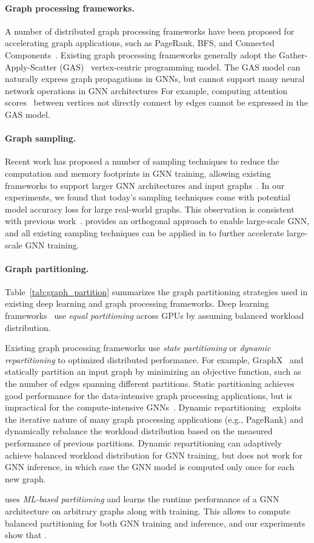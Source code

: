 \paragraph{Graph processing frameworks.}
A number of distributed graph processing frameworks have been proposed for accelerating graph applications, such as PageRank, BFS, and Connected Components~\cite{Pregel, GraphX, Lux}.
Existing graph processing frameworks generally adopt the Gather-Apply-Scatter (GAS)~\cite{PowerGraph} vertex-centric programming model. 
The GAS model can naturally express graph propagations in GNNs, but cannot support many neural network operations in GNN architectures
For example, computing attention scores~\cite{GraphAttention} between vertices not directly connect by edges cannot be expressed in the GAS model.

\paragraph{Graph sampling.}
Recent work has proposed a number of sampling techniques to reduce the computation and memory footprints in GNN training,
allowing existing frameworks to support larger GNN architectures and input graphs~\cite{GraphSAGE, PinSAGE, FastGCN}.
In our experiments, we found that today's sampling techniques come with potential model accuracy loss for large real-world graphs.
This observation is consistent with previous work~\cite{GraphSAGE}.
\Sys provides an orthogonal approach to enable large-scale GNN, and all existing sampling techniques can be applied in \Sys to further accelerate large-scale GNN training.

\paragraph{Graph partitioning.}
Table~\ref{tab:graph_partition} summarizes the graph partitioning strategies used in existing deep learning and graph processing frameworks.
Deep learning frameworks~\cite{TensorFlow, NeuGraph} use {\em equal partitioning} across GPUs by assuming balanced workload distribution.

Existing graph processing frameworks use {\em state partitioning} or {\em dynamic repartitioning} to optimized distributed performance.
For example, GraphX~\cite{GraphX} and~\cite{Gemini} statically partition an input graph by minimizing an objective function, such as the number of edges spanning different partitions.
Static partitioning achieves good performance for the data-intensive graph processing applications, but is impractical for the compute-intensive GNNs~\cite{Lux}.
Dynamic repartitioning~\cite{Presto} exploits the iterative nature of many graph processing applications (e.g., PageRank) and dynamically rebalance the workload distribution based on the measured performance of previous partitions.
Dynamic repartitioning can adaptively achieve balanced workload distribution for GNN training, but does not work for GNN inference, in which case the GNN model is computed only once for each new graph.

\Sys uses {\em ML-based partitioning} and learns the runtime performance of a GNN architecture on arbitrary graphs along with training. This allows \Sys to compute balanced partitioning for both GNN training and inference, and our experiments show that .
